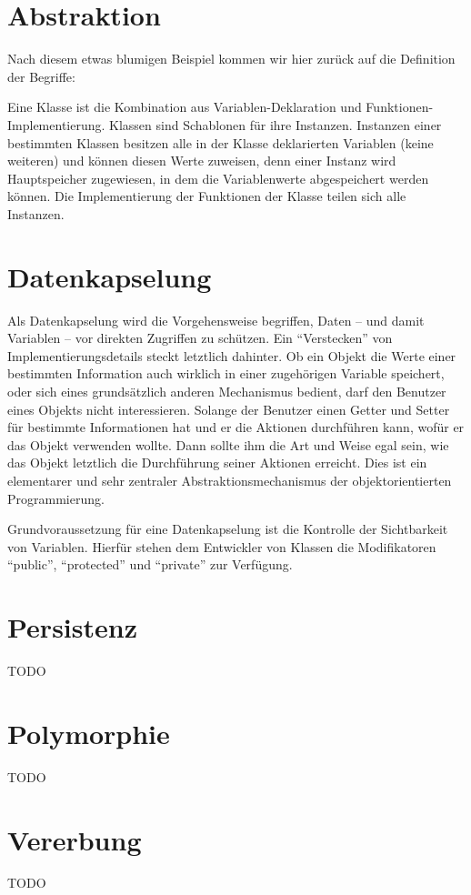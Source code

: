 \section{Abstraktion}

Nach diesem etwas blumigen Beispiel kommen wir hier zurück auf die Definition der Begriffe: 

Eine Klasse ist die Kombination aus Variablen-Deklaration und Funktionen-Implementierung. Klassen sind Schablonen für ihre Instanzen. Instanzen einer bestimmten Klassen besitzen alle in der Klasse deklarierten Variablen (keine weiteren) und können diesen Werte zuweisen, denn einer Instanz wird Hauptspeicher zugewiesen, in dem die Variablenwerte abgespeichert werden können. Die Implementierung der Funktionen der Klasse teilen sich alle Instanzen.

\section{Datenkapselung}\label{chap:encapsule}

Als Datenkapselung wird die Vorgehensweise begriffen, Daten -- und damit Variablen -- vor direkten Zugriffen zu schützen. Ein "`Verstecken"' von Implementierungsdetails steckt letztlich dahinter. Ob ein Objekt die Werte einer bestimmten Information auch wirklich in einer zugehörigen Variable speichert, oder sich eines grundsätzlich anderen Mechanismus bedient, darf den Benutzer eines Objekts nicht interessieren. Solange der Benutzer einen Getter und Setter für bestimmte Informationen hat und er die Aktionen durchführen kann, wofür er das Objekt verwenden wollte. Dann sollte ihm die Art und Weise egal sein, wie das Objekt letztlich die Durchführung seiner Aktionen  erreicht. Dies ist ein elementarer und sehr zentraler Abstraktionsmechanismus der objektorientierten Programmierung.

Grundvoraussetzung für eine Datenkapselung ist die Kontrolle der Sichtbarkeit von Variablen. Hierfür stehen dem Entwickler von Klassen die Modifikatoren "`public"', "`protected"' und "`private"' zur Verfügung. 

\section{Persistenz}
TODO

\section{Polymorphie}
TODO


\section{Vererbung}\label{chap:inherit}
TODO



